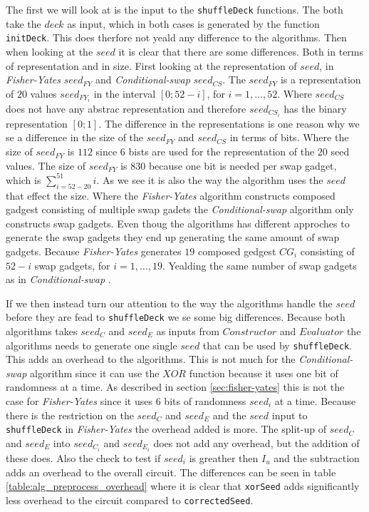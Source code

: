 \documentclass[twoside,11pt,openright]{report}
\newcommand{\FY}{\textit{Fisher-Yates} }
\newcommand{\CS}{\textit{Conditional-swap} }
\begin{document}
\bigskip

The first we will look at is the input to the \verb|shuffleDeck| functions. The both take the $deck$ as input, which in both cases is generated by the function \verb|initDeck|. This does therfore not yeald any difference to the algorithms. Then when looking at the $seed$ it is clear that there are some differences. Both in terms of representation and in size. First looking at the representation of $seed$, in \FY $seed_{FY}$ and \CS $seed_{CS}$. The $seed_{FY}$ is a representation of $20$ values $seed_{FY_i}$ in the interval $[0;52-i]$, for $i=1,\dots, 52$. Where $seed_{CS}$ does not have any abstrac representation and therefore $seed_{CS_i}$ has the binary representation $[0;1]$. The difference in the representations is one reason why we se a difference in the size of the $seed_{FY}$ and $seed_{CS}$ in terms of bits. Where the size of $seed_{FY}$ is $112$ since $6$ bists are used for the representation of the $20$ seed values. The size of $seed_{FY}$ is $830$ because one bit is needed per swap gadget, which is $\sum_{i=52-20}^{51} i$. As we see it is also the way the algorithm uses the $seed$ that effect the size. Where the \FY algorithm constructs composed gadgest consisting of multiple swap gadets the \CS algorithm only constructs swap gadgets. Even thoug the algorithms has different approches to generate the swap gadgets they end up generating the same amount of swap gadgets. Because \FY generates $19$ composed gedgest $CG_i$ consisting of $52-i$ swap gadgets, for $i=1,\dots,19$. Yealding the same number of swap gadgets as in \CS.

If we then instead turn our attention to the way the algorithms handle the $seed$ before they are fead to \verb|shuffleDeck| we se some big differences. Because both algorithms takes $seed_C$ and $seed_E$ as inputs from $Constructor$ and $Evaluator$ the algorithms needs to generate one single $seed$ that can be used by \verb|shuffleDeck|. This adds an overhead to the algorithms. This is not much for the \CS algorithm since it can use the $XOR$ function because it uses one bit of randomness at a time. As described in section \ref{sec:fisher-yates} this is not the case for \FY since it uses $6$ bits of randomness $seed_i$ at a time. Because there is the restriction on the $seed_C$ and $seed_E$ and the $seed$ input to \verb|shuffleDeck| in \FY the overhead added is more. The split-up of $seed_C$ and $seed_E$ into $seed_{C_i}$ and $seed_{E_i}$ does not add any overhead, but the addition of these does. Also the check to test if $seed_i$ is greather then $I_u$ and the subtraction adds an overhead to the overall circuit. The differences can be seen in table \ref{table:alg_preprocess_overhead} where it is clear that \verb|xorSeed| adds significantly less overhead to the circuit compared to \verb|correctedSeed|. 
\end{document}
